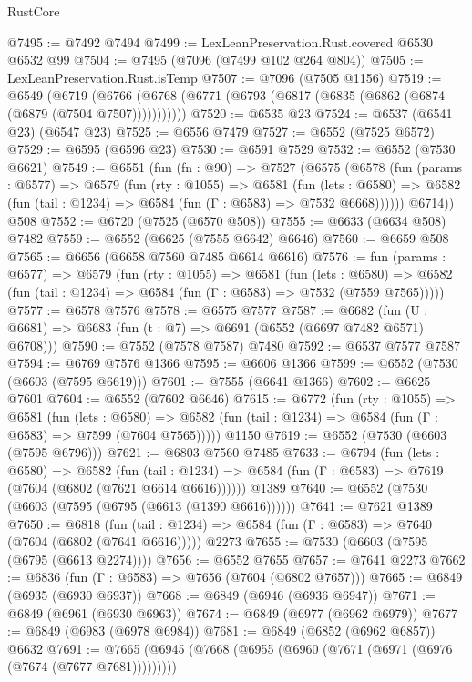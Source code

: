 \begin{lexlean}{RustCore}
\begin{coremodule}
@7495 := @7492 @7494
@7499 := LexLeanPreservation.Rust.covered @6530 @6532 @99
@7504 := @7495 (@7096 (@7499 @102 @264 @804))
@7505 := LexLeanPreservation.Rust.isTemp
@7507 := @7096 (@7505 @1156)
@7519 := @6549
    (@6719 (@6766 (@6768 (@6771 (@6793 (@6817 (@6835 (@6862 (@6874 (@6879 (@7504 @7507)))))))))))
@7520 := @6535 @23
@7524 := @6537 (@6541 @23) (@6547 @23)
@7525 := @6556 @7479
@7527 := @6552 (@7525 @6572)
@7529 := @6595 (@6596 @23)
@7530 := @6591 @7529
@7532 := @6552 (@7530 @6621)
@7549 := @6551
    (fun (fn : @90) =>
    @7527
      (@6575
        (@6578
          (fun (params : @6577) =>
          @6579
            (fun (rty : @1055) =>
            @6581
              (fun (lets : @6580) =>
              @6582 (fun (tail : @1234) => @6584 (fun (Γ : @6583) => @7532 @6668))))))
        @6714))
    @508
@7552 := @6720 (@7525 (@6570 @508))
@7555 := @6633 (@6634 @508) @7482
@7559 := @6552 (@6625 (@7555 @6642) @6646)
@7560 := @6659 @508
@7565 := @6656 (@6658 @7560 @7485 @6614 @6616)
@7576 := fun (params : @6577) =>
  @6579
    (fun (rty : @1055) =>
    @6581
      (fun (lets : @6580) =>
      @6582 (fun (tail : @1234) => @6584 (fun (Γ : @6583) => @7532 (@7559 @7565)))))
@7577 := @6578 @7576
@7578 := @6575 @7577
@7587 := @6682 (fun (U : @6681) => @6683 (fun (t : @7) => @6691 (@6552 (@6697 @7482 @6571) @6708)))
@7590 := @7552 (@7578 @7587) @7480
@7592 := @6537 @7577 @7587
@7594 := @6769 @7576 @1366
@7595 := @6606 @1366
@7599 := @6552 (@7530 (@6603 (@7595 @6619)))
@7601 := @7555 (@6641 @1366)
@7602 := @6625 @7601
@7604 := @6552 (@7602 @6646)
@7615 := @6772
    (fun (rty : @1055) =>
    @6581
      (fun (lets : @6580) =>
      @6582 (fun (tail : @1234) => @6584 (fun (Γ : @6583) => @7599 (@7604 @7565)))))
    @1150
@7619 := @6552 (@7530 (@6603 (@7595 @6796)))
@7621 := @6803 @7560 @7485
@7633 := @6794
    (fun (lets : @6580) =>
    @6582
      (fun (tail : @1234) => @6584 (fun (Γ : @6583) => @7619 (@7604 (@6802 (@7621 @6614 @6616))))))
    @1389
@7640 := @6552 (@7530 (@6603 (@7595 (@6795 (@6613 (@1390 @6616))))))
@7641 := @7621 @1389
@7650 := @6818
    (fun (tail : @1234) => @6584 (fun (Γ : @6583) => @7640 (@7604 (@6802 (@7641 @6616)))))
    @2273
@7655 := @7530 (@6603 (@7595 (@6795 (@6613 @2274))))
@7656 := @6552 @7655
@7657 := @7641 @2273
@7662 := @6836 (fun (Γ : @6583) => @7656 (@7604 (@6802 @7657)))
@7665 := @6849 (@6935 (@6930 @6937))
@7668 := @6849 (@6946 (@6936 @6947))
@7671 := @6849 (@6961 (@6930 @6963))
@7674 := @6849 (@6977 (@6962 @6979))
@7677 := @6849 (@6983 (@6978 @6984))
@7681 := @6849 (@6852 (@6962 @6857)) @6632
@7691 := @7665 (@6945 (@7668 (@6955 (@6960 (@7671 (@6971 (@6976 (@7674 (@7677 @7681)))))))))

\end{coremodule}
\end{lexlean}
